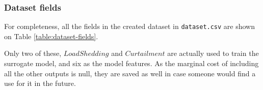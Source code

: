 


\subsubsection{Dataset fields}

For completeness, all the fields in the created dataset in \texttt{dataset.csv} are shown on Table \ref{table:dataset-fields}.

Only two of these, $LoadShedding$ and $Curtailment$ are actually used to train the surrogate model, and six as the model features. As the marginal cost of including all the other outputs is null, they are saved as well in case someone would find a use for it in the future.

